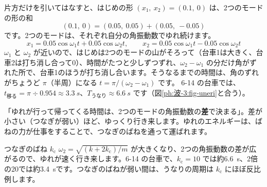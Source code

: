 片方だけを引いてはなすと、はじめの形 $(x_1,\ x_2)=(0.1,\ 0)$ は、2つのモードの形の和
\[(0.1,\ 0)=(0.05,\ 0.05)+(0.05,\ -0.05)\]
です。2つのモードは、それぞれ自分の角振動数でゆれ続けます。
\[x_1=0.05\cos\omega_1t+0.05\cos\omega_2t,\qquad x_2=0.05\cos\omega_1t-0.05\cos\omega_2t\]
$\omega_1$ と $\omega_2$ が近いので、はじめは2つのモードの山がそろって（台車1は大きく、台車2は打ち消し合って0）、時間がたつと少しずつずれ、$\omega_2-\omega_1$ の分だけ角がずれた所で、台車1のほうが打ち消し合います。そうなるまでの時間は、角のずれがちょうど $\pi$（半周）になる $t=\pi/(\omega_2-\omega_1)$ です。
6-14 の台車では、$t_{\text{移る}}=\pi\div0.954\approx\qty{3.3}{s}$、$T_{\text{うなり}}\approx\qty{6.6}{s}$ です（図\ref{ph:波-3:fig-uneri}と合う）。

\begin{phyomi}[$T_{\text{うなり}}=\dfrac{2\pi}{\omega_2-\omega_1}$]
「ゆれが行って帰ってくる時間は、2つのモードの角振動数の\textbf{差}で決まる」。差が小さい（つなぎが弱い）ほど、ゆっくり行き来します。ゆれのエネルギーは、ばねの力が仕事をすることで、つなぎのばねを通って運ばれます。
\end{phyomi}

\begin{phbaisuru}{つなぎのばね $k_{\mathrm c}$}
$\omega_2=\sqrt{(k+2k_{\mathrm c})/m}$ が大きくなり、2つの角振動数の差が広がるので、ゆれが速く行き来します。6-14 の台車で、$k_{\mathrm c}=10$ では約\qty{6.6}{s}、2倍の20では約\qty{3.4}{s}です。つなぎのばねが弱い間は、うなりの周期は $k_{\mathrm c}$ にほぼ反比例します。
\par\smallskip\noindent{}
\end{phbaisuru}

